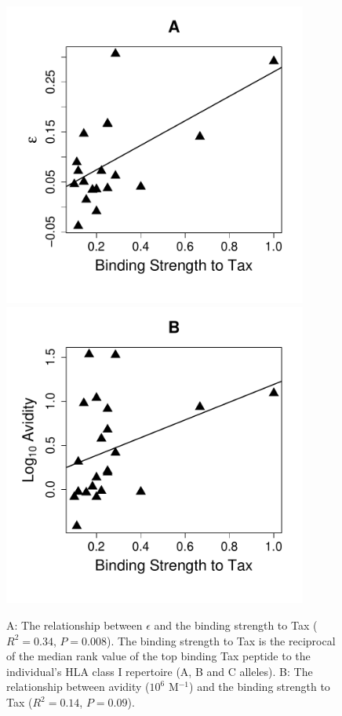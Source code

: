 \begin{figure}[htp]
\centering
\includegraphics[width=10cm]{./Figures/chapter6/EpRank} \\
\includegraphics[width=10cm]{./Figures/chapter6/avidRank} \\
\caption[Measures of CD8$^+$ T cell efficacy and specificity of MHC class I]{A: The relationship between $\epsilon$ and the binding strength to Tax ($R^2 = 0.34$, $P = 0.008$). The binding strength to Tax is the reciprocal of the median rank value of the top binding Tax peptide to the individual's HLA class I repertoire (A, B and C alleles). B: The relationship between avidity ($10^6$ M$^{-1}$) and the binding strength to Tax ($R^2 = 0.14$, $P = 0.09$).}
\label{appendixc/figureRankComp}
\end{figure}

